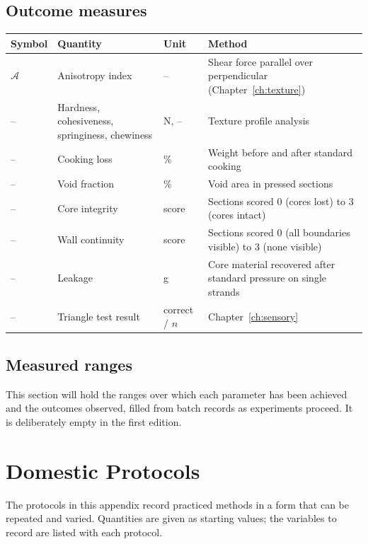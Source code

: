 \documentclass[11pt,openany]{book}
\theoremstyle{definition}
\begin{document}
\section{Outcome measures}

\begin{center}
\small
\begin{tabularx}{\linewidth}{@{}lllX@{}}
\toprule
Symbol & Quantity & Unit & Method \\
\midrule
$\mathcal{A}$ & Anisotropy index & -- & Shear force parallel over perpendicular (Chapter~\ref{ch:texture}) \\
-- & Hardness, cohesiveness, springiness, chewiness & N, -- & Texture profile analysis \\
-- & Cooking loss & \% & Weight before and after standard cooking \\
-- & Void fraction & \% & Void area in pressed sections \\
-- & Core integrity & score & Sections scored 0 (cores lost) to 3 (cores intact) \\
-- & Wall continuity & score & Sections scored 0 (all boundaries visible) to 3 (none visible) \\
-- & Leakage & g & Core material recovered after standard pressure on single strands \\
-- & Triangle test result & correct / $n$ & Chapter~\ref{ch:sensory} \\
\bottomrule
\end{tabularx}
\end{center}

\section{Measured ranges}

This section will hold the ranges over which each parameter has been achieved and the outcomes observed, filled from batch records as experiments proceed. It is deliberately empty in the first edition.

\chapter{Domestic Protocols}\label{app:protocols}

The protocols in this appendix record practiced methods in a form that can be repeated and varied. Quantities are given as starting values; the variables to record are listed with each protocol.
\end{document}
